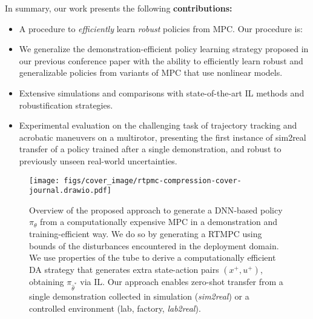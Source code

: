 In summary, our work presents the following \textbf{contributions:} 
\begin{itemize}

\item A procedure to \textit{efficiently} learn \textit{robust} policies from \ac{MPC}. Our procedure is:
\item We generalize the demonstration-efficient policy learning strategy proposed in our previous conference paper \cite{tagliabue2022efficient} with the ability to efficiently learn robust and generalizable policies from variants of \ac{MPC} that use nonlinear models. 
\item Extensive simulations and comparisons with state-of-the-art \ac{IL} methods and robustification strategies. 
\item Experimental evaluation on the challenging task of trajectory tracking and acrobatic maneuvers on a multirotor, presenting the first instance of sim2real transfer of a policy trained after a single demonstration, and robust to previously unseen real-world uncertainties. 
\end{itemize}

\begin{figure}
    \centering
    \texttt{[image: figs/cover\_image/rtpmc-compression-cover-journal.drawio.pdf]}
    \caption{Overview of the proposed approach to generate a \ac{DNN}-based policy $\pi_\theta$ from a computationally expensive \ac{MPC} in a demonstration and training-efficient way. We do so by generating a \ac{RTMPC} using bounds of the disturbances encountered in the deployment domain. We use properties of the tube to derive a computationally efficient \ac{DA} strategy that generates extra state-action pairs $(x^+, u^+)$, obtaining $\pi_{\hat{\theta}^*}$ via \ac{IL}. Our approach enables zero-shot transfer from a single demonstration collected in simulation (\textit{sim2real}) or a controlled environment (lab, factory, \textit{lab2real}).}
    \label{fig:sim_to_real_zero_shot_cover} %
    \vspace{-4ex}
\end{figure}
